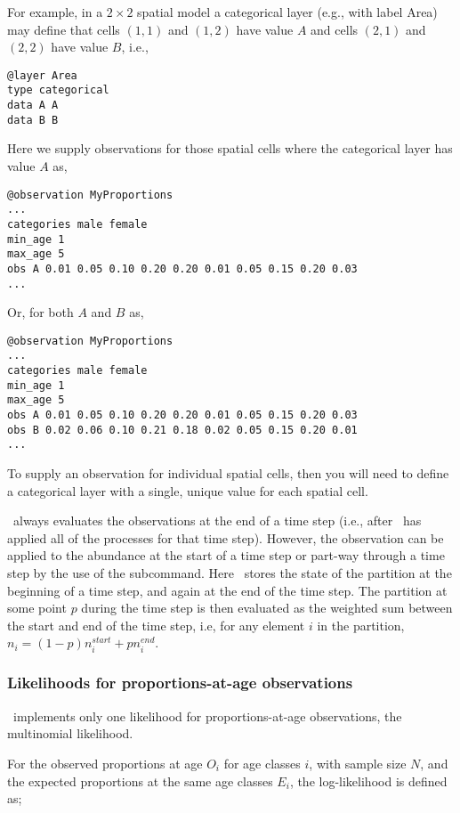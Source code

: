 For example, in a $2 \times 2$ spatial model a categorical layer (e.g., with label Area) may define that cells $(1,1)$ and $(1,2)$ have value $A$ and cells $(2,1)$ and $(2,2)$ have value $B$, i.e.,

\begin{verbatim}
@layer Area
type categorical
data A A 
data B B
\end{verbatim}

Here we supply observations for those spatial cells where the categorical layer has value $A$ as, 

\begin{verbatim}
@observation MyProportions
...
categories male female
min_age 1
max_age 5
obs A 0.01 0.05 0.10 0.20 0.20 0.01 0.05 0.15 0.20 0.03
...
\end{verbatim}

Or, for both $A$ and $B$ as,

\begin{verbatim}
@observation MyProportions
...
categories male female
min_age 1
max_age 5
obs A 0.01 0.05 0.10 0.20 0.20 0.01 0.05 0.15 0.20 0.03
obs B 0.02 0.06 0.10 0.21 0.18 0.02 0.05 0.15 0.20 0.01
...
\end{verbatim}

To supply an observation for individual spatial cells, then you will need to define a categorical layer with a single, unique value for each spatial cell. 

\SPM\ always evaluates the observations at the end of a time step (i.e., after \SPM\ has applied all of the processes for that time step). However, the observation can be applied to the abundance at the start of a time step or part-way through a time step by the use of the  subcommand. Here \SPM\ stores the state of the partition at the beginning of a time step, and again at the end of the time step. The partition at some point $p$ during the time step is then evaluated as the weighted sum between the start and end of the time step, i.e, for any element $i$ in the partition, $n_i=(1-p) n_i^{start} + p n_i^{end}$.

\subsubsection{Likelihoods for proportions-at-age observations}

\SPM\ implements only one likelihood for proportions-at-age observations, the multinomial likelihood. 

For the observed proportions at age $O_i$ for age classes $i$, with sample size $N$, and the expected proportions at the same age classes $E_i$, the log-likelihood is defined as; 

